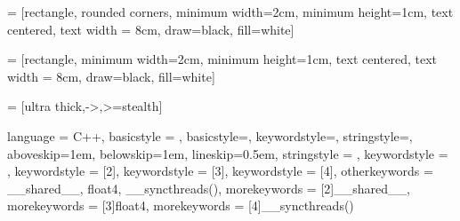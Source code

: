 \usepackage{adjustbox} %

\usepackage{mathtools} %

\usepackage{setspace}
\usepackage{indentfirst}
\usepackage{listings}
\usepackage{subfig}
\setlength{\headheight}{25pt}%

\makeatletter
\newcommand{\gettikzxy}[3]{%
  \tikz@scan@one@point\pgfutil@firstofone#1\relax
  \edef#2{\the\pgf@x}%
  \edef#3{\the\pgf@y}%
}
\makeatother

\usepackage{tikz} %
\usetikzlibrary{positioning} %
\usetikzlibrary{calc} %
\usetikzlibrary{shapes.geometric, arrows}

 = [rectangle, rounded corners, minimum width=2cm, minimum height=1cm, text centered, text width = 8cm, draw=black, fill=white]


 = [rectangle, minimum width=2cm, minimum height=1cm, text centered, text width = 8cm, draw=black, fill=white]


 = [ultra thick,->,>=stealth]
\usepackage{xcolor}
{
    language = C++,
    basicstyle = {\ttfamily \color{main-color}},
    basicstyle=\ttfamily\small,
    keywordstyle=\color{blue}\ttfamily,
    stringstyle=\color{red}\ttfamily,
    aboveskip=1em,
    belowskip=1em,
    lineskip=0.5em,
    stringstyle = {\color{string-color}},
    keywordstyle = {\color{key-color}},
    keywordstyle = [2]{\color{green}},
    keywordstyle = [3]{\color{orange}},
    keywordstyle = [4]{\color{teal}},
    otherkeywords = {__shared__, float4, __syncthreads()},
    morekeywords = [2]{__shared__},
    morekeywords = [3]{float4},
    morekeywords = [4]{__syncthreads()}
}

